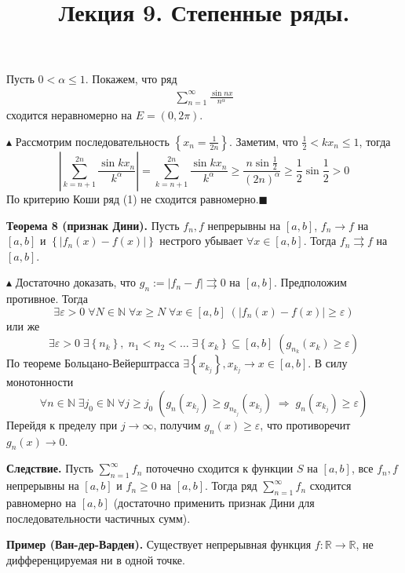 \documentclass[a4paper, 16pt]{article}
\date{}
\begin{document}
\title{Лекция 9. Степенные ряды.}
\maketitle

Пусть $0 < \alpha \leqslant 1$. Покажем, что ряд
\begin{align}
    \sum\limits_{n=1}^{\infty}\frac{\sin nx}{n^\alpha}
\end{align}
сходится неравномерно на $E=(0, 2\pi)$.

$\blacktriangle$
Рассмотрим последовательность $\left\{x_n=\frac{1}{2n}\right\}$. Заметим, что $\frac{1}{2} < kx_n \leqslant 1$, тогда
$$
\left|\sum\limits_{k=n+1}^{2n}\frac{\sin kx_n}{k^\alpha}\right|=\sum\limits_{k=n+1}^{2n}\frac{\sin kx_n}{k^\alpha} \geqslant \frac{n\sin \frac{1}{2}}{(2n)^\alpha} \geqslant \frac{1}{2}\sin \frac{1}{2} > 0
$$
По критерию Коши ряд (1) не сходится равномерно.\:$\blacksquare$

\textbf{Теорема 8 (признак Дини).} Пусть $f_n, f$ непрерывны на $[a, b]$, $f_n \to f$ на $[a, b]$ и $\left\{|f_n(x) - f(x)|\right\}$ нестрого убывает $\forall x \in [a, b]$. Тогда $f_n\rightrightarrows f$ на $[a, b]$.

$\blacktriangle$
Достаточно доказать, что $g_n:=|f_n-f|\rightrightarrows0$ на $[a, b]$. Предположим противное. Тогда
$$
\exists\varepsilon > 0\; \forall N \in \mathbb{N}\;\forall x \geqslant N \;\forall x \in [a, b]\;\left(\left|f_n(x)-f(x)\right|\geqslant \varepsilon\right)
$$
или же
$$
\exists\varepsilon>0\;\exists\left\{n_k\right\},\;n_1<n_2<\ldots\;\exists\left\{x_k\right\} \subseteq [a, b]\;\left(g_{n_k}(x_k)\geqslant\varepsilon\right)
$$
По теореме Больцано-Вейерштрасса $\exists\left\{x_{k_j}\right\}, x_{k_j} \to x \in [a, b]$. В силу монотонности
$$\forall n \in \mathbb{N}\;\exists j_0 \in \mathbb{N}\;\forall j \geqslant j_0\;\left(g_n(x_{k_j})\geqslant g_{n_{k_j}}(x_{k_j})\;\Rightarrow\;g_n(x_{k_j})\geqslant\varepsilon\right)$$
Перейдя к пределу при $j \to \infty$, получим $g_n(x) \geqslant \varepsilon$, что противоречит $g_n(x)\to 0$.\;\blacksquare

\textbf{Следствие.} Пусть $\sum\limits_{n=1}^{\infty}f_n$ поточечно сходится к функции $S$ на $[a, b]$, все $f_n, f$ непрерывны на $[a, b]$ и $f_n \geqslant 0$ на $[a, b]$. Тогда ряд $\sum\limits_{n=1}^{\infty}f_n$ сходится равномерно на $[a, b]$ (достаточно применить признак Дини для последовательности частичных сумм).

\textbf{Пример (Ван-дер-Варден).} Существует непрерывная функция $f:\mathbb{R}\to\mathbb{R}$, не дифференцируемая ни в одной точке.
\end{document}
